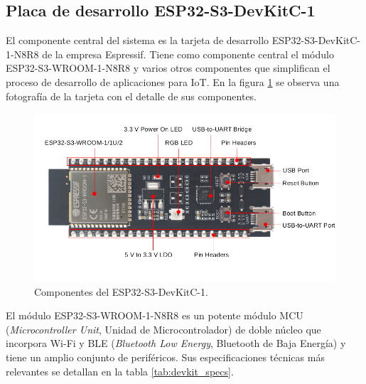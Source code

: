 \subsection{Placa de desarrollo ESP32-S3-DevKitC-1}
El componente central del sistema es la tarjeta de desarrollo ESP32-S3-DevKitC-1-N8R8 de la empresa Espressif. Tiene como componente central el módulo ESP32-S3-WROOM-1-N8R8 y varios otros componentes que simplifican el proceso de desarrollo de aplicaciones para IoT. En la figura \ref{fig:devkit_comp} se observa una fotografía de la tarjeta con el detalle de sus componentes.

\begin{figure}[h]
	\centering
	\includegraphics[scale=0.45]{./Figures/devkit_comp.png}
	\caption{Componentes del ESP32-S3-DevKitC-1\protect\footnotemark.}
	\label{fig:devkit_comp}
\end{figure}

El módulo ESP32-S3-WROOM-1-N8R8 es un potente módulo MCU (\textit{Microcontroller Unit}, Unidad de Microcontrolador) de doble núcleo que incorpora Wi-Fi y BLE (\textit{Bluetooth Low Energy}, Bluetooth de Baja Energía) y tiene un amplio conjunto de periféricos. Sus especificaciones técnicas más relevantes se detallan en la tabla \ref{tab:devkit_specs}.

